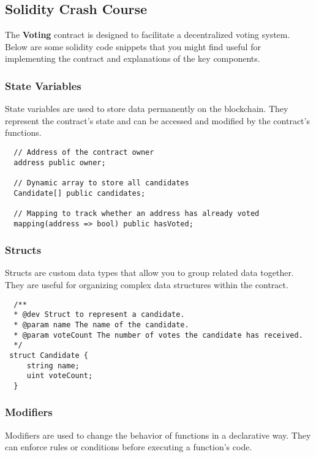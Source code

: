 \documentclass[12pt]{article}
\begin{document}
\subsection{Solidity Crash Course}

The \textbf{Voting} contract is designed to facilitate a decentralized voting system. Below are some solidity code snippets that you might find useful for implementing the contract and explanations of the key components.

\subsubsection*{State Variables}

State variables are used to store data permanently on the blockchain. They represent the contract's state and can be accessed and modified by the contract's functions.

\begin{verbatim}
  // Address of the contract owner
  address public owner;

  // Dynamic array to store all candidates
  Candidate[] public candidates;

  // Mapping to track whether an address has already voted
  mapping(address => bool) public hasVoted;
\end{verbatim}

\subsubsection*{Structs}

Structs are custom data types that allow you to group related data together. They are useful for organizing complex data structures within the contract.

\begin{verbatim}
  /**
  * @dev Struct to represent a candidate.
  * @param name The name of the candidate.
  * @param voteCount The number of votes the candidate has received.
  */
 struct Candidate {
     string name;
     uint voteCount;
  }
\end{verbatim}

\subsubsection*{Modifiers}

Modifiers are used to change the behavior of functions in a declarative way. They can enforce rules or conditions before executing a function's code.
\end{document}
